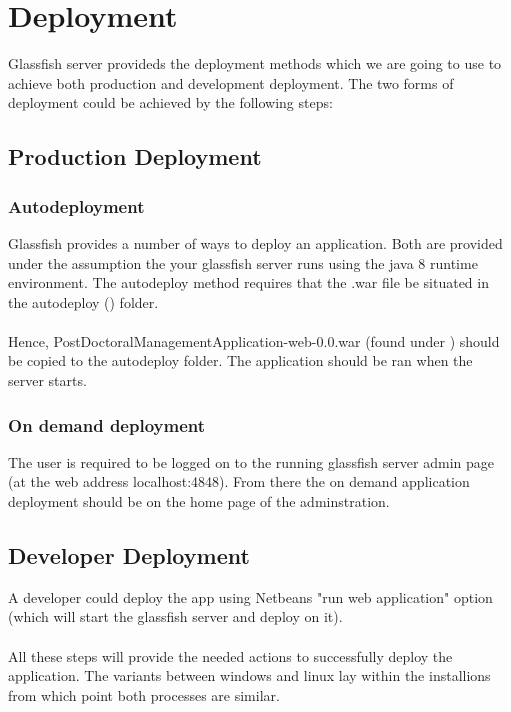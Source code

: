 \documentclass[12pt]{article}
\begin{document}
\section{Deployment}
Glassfish server provideds the deployment methods which we are going to use to achieve both production and development deployment. The two forms of deployment could be achieved by the following steps:
\subsection{Production Deployment}
\subsubsection{Autodeployment}
Glassfish provides a number of ways to deploy an application. Both are provided under the assumption the your glassfish server runs using the java 8 runtime environment. The autodeploy method requires that the .war file be situated in the autodeploy (\textbf{}) folder.\\
\\
Hence, PostDoctoralManagementApplication-web-0.0.war (found under \textbf{}) should be copied to the autodeploy folder. The application should be ran when the server starts.
\subsubsection{On demand deployment}
The user is required to be logged on to the running glassfish server admin page (at the web address localhost:4848). From there the on demand application deployment should be on the home page of the adminstration.
\subsection{Developer Deployment}
A developer could deploy the app using Netbeans "run web application" option (which will start the glassfish server and deploy on it).\\
\\
All these steps will provide the needed actions to successfully deploy the application. The variants between windows and linux lay within the installions from which point both processes are similar.
\end{document}
